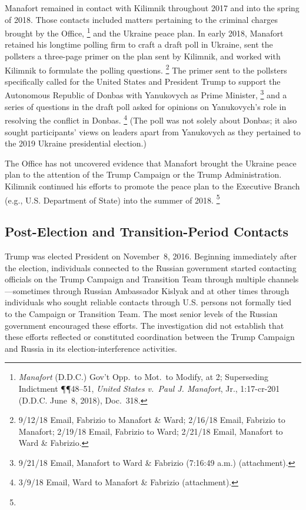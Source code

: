 Manafort remained in contact with Kilimnik throughout 2017 and into the spring of 2018.
Those contacts included matters pertaining to the criminal charges brought by the Office,%
\footnote{\textit{Manafort} (D.D.C.) Gov't Opp.\ to Mot.\ to Modify, at 2;
Superseding Indictment \P\P 48--51, \textit{United States v.\ Paul J. Manafort}, Jr., 1:17-cr-201 (D.D.C. June~8, 2018), Doc.~318.}
and the Ukraine peace plan.
In early 2018, Manafort retained his longtime polling firm to craft a draft poll in Ukraine, sent the pollsters a three-page primer on the plan sent by Kilimnik, and worked with Kilimnik to formulate the polling questions.%
\footnote{9/12/18 Email, Fabrizio to Manafort \& Ward;
2/16/18 Email, Fabrizio to Manafort;
2/19/18 Email, Fabrizio to Ward;
2/21/18 Email, Manafort to Ward \& Fabrizio.}
The primer sent to the pollsters specifically called for the United States and President Trump to support the Autonomous Republic of Donbas with Yanukovych as Prime Minister,%
\footnote{9/21/18 Email, Manafort to Ward \& Fabrizio (7:16:49 a.m.) (attachment).}
and a series of questions in the draft poll asked for opinions on Yanukovych's role in resolving the conflict in Donbas.%
\footnote{3/9/18 Email, Ward to Manafort \& Fabrizio (attachment).}
(The poll was not solely about Donbas; it also sought participants' views on leaders apart from Yanukovych as they pertained to the 2019 Ukraine presidential election.)

The Office has not uncovered evidence that Manafort brought the Ukraine peace plan to the attention of the Trump Campaign or the Trump Administration.
Kilimnik continued his efforts to promote the peace plan to the Executive Branch (e.g., U.S. Department of State) into the summer of 2018.%
\footnote{}

\subsection{Post-Election and Transition-Period Contacts}

Trump was elected President on November~8, 2016.
Beginning immediately after the election, individuals connected to the Russian government started contacting officials on the Trump Campaign and Transition Team through multiple channels---sometimes through Russian Ambassador Kislyak and at other times through individuals who sought reliable contacts through U.S. persons not formally tied to the Campaign or Transition Team.
The most senior levels of the Russian government encouraged these efforts.
The investigation did not establish that these efforts reflected or constituted coordination between the Trump Campaign and Russia in its election-interference activities.

